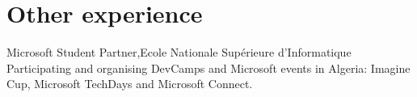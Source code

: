 \section{Other experience}
 \resumeSubHeadingListStart
 \resumeSubheading
      {Microsoft Student Partner,}{Ecole Nationale Supérieure d’Informatique}{}
      {}
      \resumeItemListStart
      \vspace{+10pt}
      \renewcommand{\labelitemii}{\raisebox{.25cm}{$\bullet$}}
        {Participating and organising DevCamps and Microsoft events in Algeria: Imagine Cup, Microsoft TechDays and Microsoft Connect.}
    \resumeItemListEnd
\resumeSubHeadingListEnd